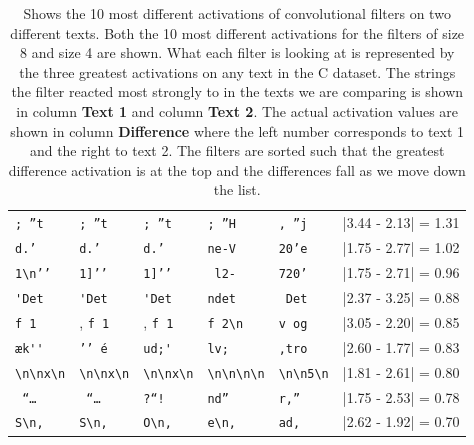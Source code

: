 \begin{table}
\begin{tabular}{lll|lll}
        \verb[; ”t[       & \verb[; ”t[       & \verb[; ”t[          &
        \verb'; ”H'       & \verb', ”j'       & |3.44 - 2.13| = 1.31 \\

        \verb[d.’ [       & \verb[d.’ [       & \verb[d.’ [          &
        \verb'ne-V'       & \verb'20’e'       & |1.75 - 2.77| = 1.02 \\

        \verb[1\n’’[      & \verb[1]’’[       & \verb[1]’’[          &
        \verb' l2-'       & \verb'720’'       & |1.75 - 2.71| = 0.96 \\

        \verb['Det[       & \verb['Det[       & \verb['Det[          &
        \verb'ndet'       & \verb' Det'       & |2.37 - 3.25| = 0.88 \\

        \verb[f 1[        &, \verb[f 1[       &, \verb[f 1[          &
        \verb'f 2\n'      & \verb'v og'       & |3.05 - 2.20| = 0.85 \\

        \verb[æk''[       & \verb[’’ é[       & \verb[ud;'[          &
        \verb'lv; '       & \verb',tro'       & |2.60 - 1.77| = 0.83 \\

        \verb[\n\nx\n[    & \verb[\n\nx\n[    & \verb[\n\nx\n[       &
        \verb'\n\n\n\n'   & \verb'\n\n5\n'    & |1.81 - 2.61| = 0.80 \\
        \verb[ “… [       & \verb[ “… [       & \verb[?“! [          &
        \verb'nd” '       & \verb'r,” '       & |1.75 - 2.53| = 0.78 \\

        \verb[S\n, [      & \verb[S\n, [      & \verb[O\n, [         &
        \verb'e\n, '      & \verb'ad, '       & |2.62 - 1.92| = 0.70 \\
    \end{tabular}
    \caption{Shows the 10 most different activations of convolutional filters on
        two different texts. Both the 10 most different activations for the
        filters of size 8 and size 4 are shown. What each filter is looking at is
        represented by the three greatest activations on any text in the \gls{C}
        dataset. The strings the filter reacted most strongly to in the texts we
        are comparing is shown in column \textbf{Text 1} and column \textbf{Text
        2}. The actual activation values are shown in column \textbf{Difference}
        where the left number corresponds to text 1 and the right to text 2. The
        filters are sorted such that the greatest difference activation is at
        the top and the differences fall as we move down the list.}
    \label{tab:teacher_feedback_output}
\end{table}

